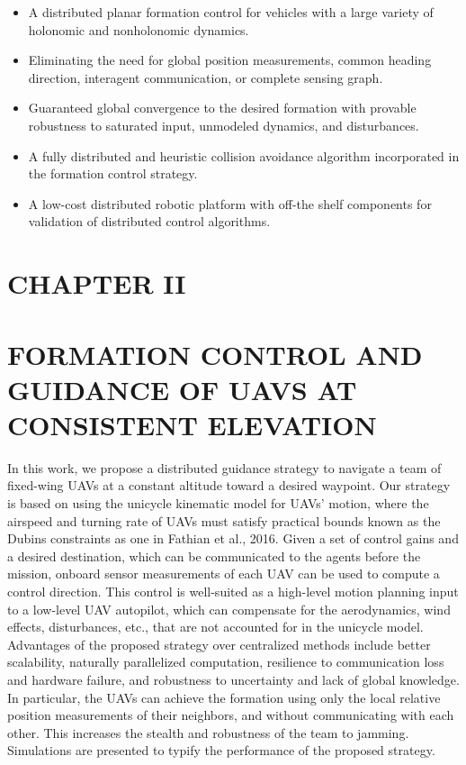 \documentclass[10pt]{article}
\begin{document}
\begin{itemize}
  \item A distributed planar formation control for vehicles with a large variety of holonomic and nonholonomic dynamics.

  \item Eliminating the need for global position measurements, common heading direction, interagent communication, or complete sensing graph.

  \item Guaranteed global convergence to the desired formation with provable robustness to saturated input, unmodeled dynamics, and disturbances.

  \item A fully distributed and heuristic collision avoidance algorithm incorporated in the formation control strategy.

  \item A low-cost distributed robotic platform with off-the shelf components for validation of distributed control algorithms.

\end{itemize}

\section{CHAPTER II}
\section{FORMATION CONTROL AND GUIDANCE OF UAVS AT CONSISTENT ELEVATION}
In this work, we propose a distributed guidance strategy to navigate a team of fixed-wing UAVs at a constant altitude toward a desired waypoint. Our strategy is based on using the unicycle kinematic model for UAVs' motion, where the airspeed and turning rate of UAVs must satisfy practical bounds known as the Dubins constraints as one in Fathian et al., 2016. Given a set of control gains and a desired destination, which can be communicated to the agents before the mission, onboard sensor measurements of each UAV can be used to compute a control direction. This control is well-suited as a high-level motion planning input to a low-level UAV autopilot, which can compensate for the aerodynamics, wind effects, disturbances, etc., that are not accounted for in the unicycle model. Advantages of the proposed strategy over centralized methods include better scalability, naturally parallelized computation, resilience to communication loss and hardware failure, and robustness to uncertainty and lack of global knowledge. In particular, the UAVs can achieve the formation using only the local relative position measurements of their neighbors, and without communicating with each other. This increases the stealth and robustness of the team to jamming. Simulations are presented to typify the performance of the proposed strategy.
\end{document}
